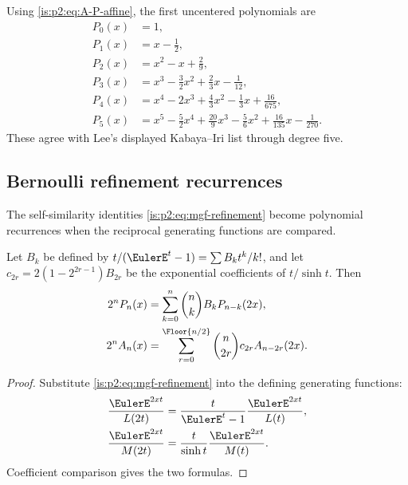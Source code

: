 Using \eqref{is:p2:eq:A-P-affine}, the first uncentered polynomials are
\begin{equation}
\begin{aligned}
 P_0(x)&=1,\\
 P_1(x)&=x-\frac12,\\
 P_2(x)&=x^2-x+\frac29,\\
 P_3(x)&=x^3-\frac32x^2+\frac23x-\frac1{12},\\
 P_4(x)&=x^4-2x^3+\frac43x^2-\frac13x+\frac{16}{675},\\
 P_5(x)&=x^5-\frac52x^4+\frac{20}{9}x^3-\frac56x^2+\frac{16}{135}x-\frac1{270}.
\end{aligned}
\label{is:p2:eq:P-first-polys}
\end{equation}
These agree with Lee's displayed Kabaya--Iri list through degree five.

\subsection{Bernoulli refinement recurrences}

The self-similarity identities \eqref{is:p2:eq:mgf-refinement} become polynomial recurrences when the
reciprocal generating functions are compared.

\begin{proposition}
\label{is:p2:prop:Bernoulli-refinement}
Let $B_k$ be defined by $t/(\EulerE^t-1)=\sum B_kt^k/k!$, and let
$c_{2r}=2(1-2^{2r-1})B_{2r}$ be the exponential coefficients of
$t/\sinh t$.  Then
\begin{align}
 2^nP_n(x)
 &=\sum_{k=0}^n\binom nkB_kP_{n-k}(2x),
 \label{is:p2:eq:P-Bernoulli-refinement}\\
 2^nA_n(x)
 &=\sum_{r=0}^{\Floor{n/2}}
   \binom n{2r}c_{2r}A_{n-2r}(2x).
 \label{is:p2:eq:A-Bernoulli-refinement}
\end{align}
\end{proposition}

\begin{proof}
Substitute \eqref{is:p2:eq:mgf-refinement} into the defining generating functions:
\begin{align*}
 \frac{\EulerE^{2xt}}{L(2t)}
 &=\frac{t}{\EulerE^t-1}\frac{\EulerE^{2xt}}{L(t)},\\
 \frac{\EulerE^{2xt}}{M(2t)}
 &=\frac{t}{\sinh t}\frac{\EulerE^{2xt}}{M(t)}.
\end{align*}
Coefficient comparison gives the two formulas.
\end{proof}

